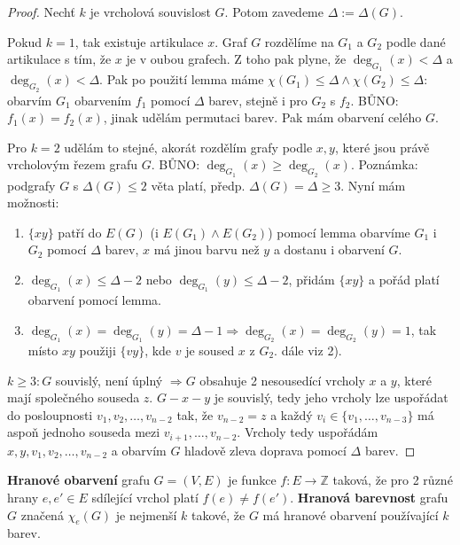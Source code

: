 \begin{proof}
	Nechť $k$ je vrcholová souvislost $G$. Potom zavedeme $\Delta := \Delta (G)$.
	
	Pokud $k = 1$, tak existuje artikulace $x$. Graf $G$ rozdělíme na $G_{1}$ a $G_{2}$ podle dané artikulace s tím, že $x$ je v oubou grafech. Z toho pak plyne, že $\deg_{G_{1}}(x) < \Delta$ a $\deg_{G_{2}}(x) < \Delta$. Pak po použití lemma máme $\chi(G_{1}) \leq \Delta \land \chi(G_{2}) \leq \Delta:$ obarvím $G_{1}$ obarvením $f_{1}$ pomocí $\Delta$ barev, stejně i pro $G_{2}$ s $f_{2}$. BŮNO: $f_{1}(x) = f_{2}(x)$, jinak udělám permutaci barev. Pak mám obarvení celého $G$.
	
	Pro $k=2$ udělám to stejné, akorát rozdělím grafy podle $x,y$, které jsou právě vrcholovým řezem grafu $G$. BŮNO: $\deg_{G_{1}}(x) \geq \deg_{G_{2}}(x)$. Poznámka: podgrafy $G$ s $\Delta(G) \leq 2$ věta platí, předp. $\Delta(G) = \Delta \geq 3$. Nyní mám možnosti:
	
	\begin{enumerate}
		\item $\{xy\}$ patří do $E(G)$ (i $E(G_{1}) \land E(G_{2})$) pomocí lemma obarvíme $G_{1}$ i $G_{2}$ pomocí $\Delta$ barev, $x$ má jinou barvu než $y$ a dostanu i obarvení $G$.
		\item $\deg_{G_{1}}(x) \leq \Delta - 2$ nebo $\deg_{G_{1}}(y) \leq \Delta - 2$, přidám $\{xy\}$ a pořád platí obarvení pomocí lemma.
		\item $\deg_{G_{1}}(x) = \deg_{G_{1}}(y) = \Delta - 1 \Rightarrow \deg_{G_{2}}(x) = \deg_{G_{2}}(y) = 1$, tak místo $xy$ použiji $\{vy\}$, kde $v$ je soused $x$ z $G_{2}$. dále viz 2).
	\end{enumerate}
	
	$k \geq 3: G$ souvislý, není úplný $\Rightarrow G$ obsahuje 2 nesousedící vrcholy $x$ a $y$, které mají společného souseda $z$. $G - x - y$ je souvislý, tedy jeho vrcholy lze uspořádat do posloupnosti $v_{1},v_{2}, \dots, v_{n-2}$ tak, že $v_{n-2} = z$ a každý $v_{i} \in \{v_{1}, \dots, v_{n-3}\}$ má aspoň jednoho souseda mezi $v_{i+1}, \dots, v_{n-2}$. Vrcholy tedy uspořádám $x,y,v_{1},v_{2},\dots,v_{n-2}$ a obarvím $G$ hladově zleva doprava pomocí $\Delta$ barev.
\end{proof}

\begin{definice}
	\textbf{Hranové obarvení} grafu $G = (V,E)$ je funkce $f: E \to \mathbb{Z}$ taková, že pro 2 různé hrany $e, e' \in E$ sdílející vrchol platí $f(e) \neq f(e')$. \textbf{Hranová barevnost} grafu $G$ značená $\chi_{e}(G)$ je nejmenší $k$ takové, že $G$ má hranové obarvení používající $k$ barev.
\end{definice}

